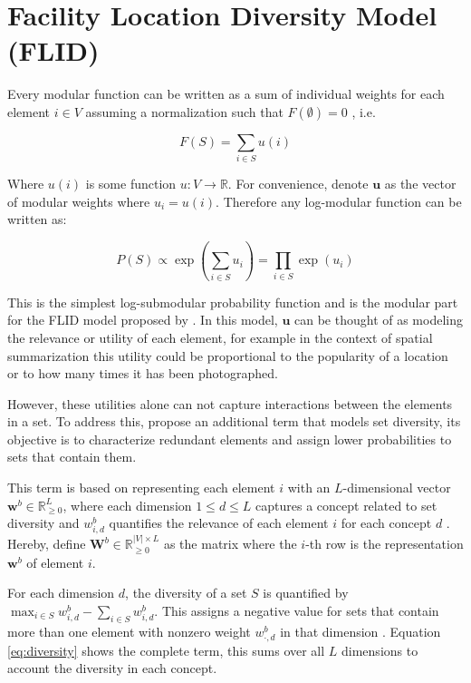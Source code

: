 \section{Facility Location Diversity Model (FLID)}

Every modular function can be written as a sum of individual weights for each element $i \in V$ assuming a normalization such that $F(\emptyset) = 0$ \citep{krause14submodular}, i.e.

\begin{equation}
  F(S) = \sum_{i \in S} u(i)
\end{equation}

Where $u(i)$ is some function $u: V \rightarrow \mathbb{R}$. For convenience, denote $\mathbf{u}$ as the vector of modular weights where $u_{i} = u(i)$. Therefore any log-modular function can be written as:

\begin{equation}
  \label{eq:modular}
  P(S) \propto \exp{\left(\sum_{i \in S}u_{i}\right)}= \prod_{i \in S} \exp{\left(u_{i}\right)}
\end{equation}

This is the simplest log-submodular probability function and is the modular part for the FLID model proposed by \citet{tschiatschek16learning}. In this model, $\mathbf{u}$ can be thought of as modeling the relevance or utility of each element, for example in the context of spatial summarization this utility could be proportional to the popularity of a location or to how many times it has been photographed.

However, these utilities alone can not capture interactions between the elements in a set. To address this, \citet{tschiatschek16learning} propose an additional term that models set diversity, its objective is to characterize redundant elements and assign lower probabilities to sets that contain them.

This term is based on representing each element $i$ with an $L$-dimensional vector $\mathbf{w}^{b} \in \mathbb{R}^{L}_{\geq 0}$, where each dimension $1 \leq d \leq L$ captures a concept related to set diversity and $w^{b}_{i,d}$ quantifies the relevance of each element $i$ for each concept $d$ \citep{tschiatschek16learning}. Hereby, define $\mathbf{W}^{b} \in \mathbb{R}^{|V| \times L}_{\geq 0}$ as the matrix where the $i$-th row is the representation $\mathbf{w}^{b}$ of element $i$.

For each dimension $d$, the diversity of a set $S$ is quantified by $\max_{i \in S}{w^{b}_{i,d}} - \sum_{i \in S}{w^{b}_{i,d}}$. This assigns a negative value for sets that contain more than one element with nonzero weight $w^{b}_{\cdot,d}$ in that dimension \citep{tschiatschek16learning}. Equation \eqref{eq:diversity} shows the complete term, this sums over all $L$ dimensions to account the diversity in each concept.

